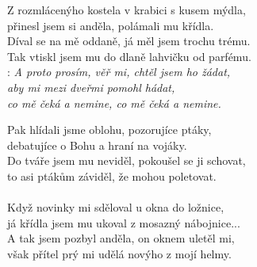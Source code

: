 
Z rozmlácenýho kostela
v krabici s kusem mýdla,\\
přinesl jsem si anděla,
polámali mu křídla.\\
Díval se na mě oddaně,
já měl jsem trochu trému.\\
Tak vtiskl jsem mu do dlaně
lahvičku od parfému.\\

\textregistered:
\emph{A proto prosím, věř mi, chtěl jsem ho žádat,\\
aby mi mezi dveřmi pomohl hádat,\\
co mě čeká \hspace{1cm} a nemine,
co mě čeká \hspace{1cm} a nemine.\\
}

Pak hlídali jsme oblohu, pozorujíce ptáky,\\
debatujíce o Bohu a hraní na vojáky.\\
Do tváře jsem mu neviděl, pokoušel se ji schovat,\\
to asi ptákům záviděl, že mohou poletovat.\\
\textregistered\\

Když novinky mi sděloval u okna do ložnice,\\
já křídla jsem mu ukoval z mosazný nábojnice...\\
A tak jsem pozbyl anděla, on oknem uletěl mi,\\
však přítel prý mi udělá novýho z mojí helmy.\\
\textregistered

\newpage

